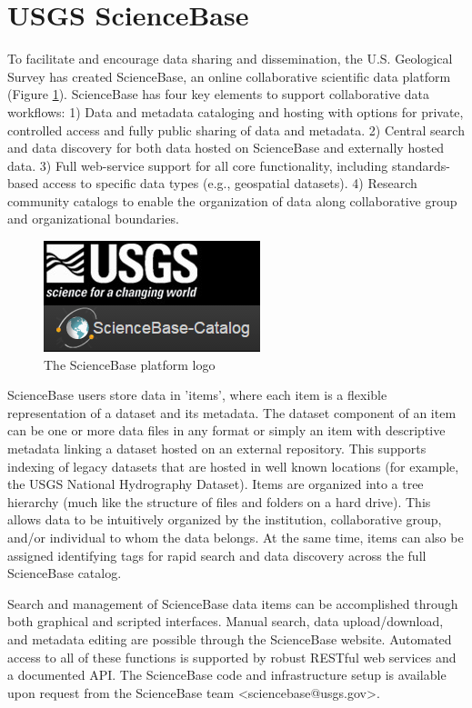 \section{USGS ScienceBase}

To facilitate and encourage data sharing and dissemination,
the U.S. Geological Survey has created ScienceBase, an online
collaborative scientific data platform (Figure \ref{figure:sbfig}). 
ScienceBase has four key elements to support collaborative
data workflows: 1) Data and metadata
cataloging and hosting with options for private, controlled access
and fully public sharing of data and metadata. 2) Central search and
data discovery for both data hosted on ScienceBase and externally hosted 
data. 3) Full web-service support for all core functionality, including
standards-based access to specific data types (e.g., geospatial
datasets). 4) Research community catalogs to
enable the organization of data along collaborative group and
organizational boundaries.

 \begin{figure}[htbp]
   \centering
   \includegraphics{sblogo}
   \caption{The ScienceBase platform logo}
   \label{figure:sbfig}
 \end{figure}

ScienceBase users store data in 'items', where each item is a flexible
representation of a dataset and its metadata. The dataset component of an
item can be one or more data files in any format or simply an item with descriptive
metadata linking a dataset hosted on an external repository. This supports
indexing of legacy datasets that are hosted in well known locations (for example, 
the USGS National Hydrography Dataset). Items are organized into a tree hierarchy 
(much like the structure of files and
folders on a hard drive). This allows data to be intuitively organized by the
institution, collaborative group, and/or individual to whom
the data belongs. At the same time, items can also be assigned identifying tags
for rapid search and data discovery across the full ScienceBase catalog.

Search and management of ScienceBase data items can be accomplished through
both graphical and scripted interfaces. Manual search, data upload/download, and
metadata editing are possible through the ScienceBase website.
Automated access to all of these functions is supported by robust RESTful web
services and a documented API. The ScienceBase code and infrastructure setup 
is available upon request from the ScienceBase team <sciencebase@usgs.gov>.

